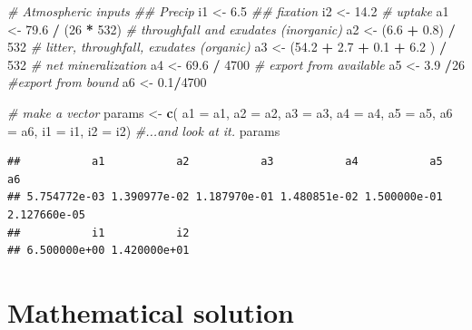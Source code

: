 \documentclass[
]{book}
\newenvironment{Shaded}{\begin{snugshade}}{\end{snugshade}}
\newcommand{\CommentTok}[1]{\textcolor[rgb]{0.56,0.35,0.01}{\textit{#1}}}
\newcommand{\DataTypeTok}[1]{\textcolor[rgb]{0.13,0.29,0.53}{#1}}
\newcommand{\DecValTok}[1]{\textcolor[rgb]{0.00,0.00,0.81}{#1}}
\newcommand{\FloatTok}[1]{\textcolor[rgb]{0.00,0.00,0.81}{#1}}
\newcommand{\KeywordTok}[1]{\textcolor[rgb]{0.13,0.29,0.53}{\textbf{#1}}}
\newcommand{\NormalTok}[1]{#1}
\newcommand{\OperatorTok}[1]{\textcolor[rgb]{0.81,0.36,0.00}{\textbf{#1}}}
\newcommand{\StringTok}[1]{\textcolor[rgb]{0.31,0.60,0.02}{#1}}
\begin{document}
\begin{Shaded}
\begin{Highlighting}[]
\CommentTok{# Atmospheric inputs}
\CommentTok{##  Precip}
\NormalTok{i1 <-}\StringTok{ }\FloatTok{6.5}
\CommentTok{## fixation}
\NormalTok{i2 <-}\StringTok{ }\FloatTok{14.2}
\CommentTok{# uptake}
\NormalTok{a1 <-}\StringTok{ }\FloatTok{79.6} \OperatorTok{/}\StringTok{ }\NormalTok{(}\DecValTok{26} \OperatorTok{*}\StringTok{ }\DecValTok{532}\NormalTok{)}
\CommentTok{# throughfall and exudates (inorganic)}
\NormalTok{a2 <-}\StringTok{ }\NormalTok{(}\FloatTok{6.6} \OperatorTok{+}\StringTok{ }\FloatTok{0.8}\NormalTok{) }\OperatorTok{/}\StringTok{ }\DecValTok{532}
\CommentTok{# litter, throughfall, exudates (organic)}
\NormalTok{a3 <-}\StringTok{ }\NormalTok{(}\FloatTok{54.2} \OperatorTok{+}\StringTok{ }\FloatTok{2.7} \OperatorTok{+}\StringTok{ }\FloatTok{0.1} \OperatorTok{+}\StringTok{ }\FloatTok{6.2}\NormalTok{ ) }\OperatorTok{/}\StringTok{ }\DecValTok{532}
\CommentTok{# net mineralization}
\NormalTok{a4 <-}\StringTok{ }\FloatTok{69.6} \OperatorTok{/}\StringTok{ }\DecValTok{4700}
\CommentTok{# export from available}
\NormalTok{a5 <-}\StringTok{ }\FloatTok{3.9} \OperatorTok{/}\DecValTok{26}
\CommentTok{#export from bound}
\NormalTok{a6 <-}\StringTok{ }\FloatTok{0.1}\OperatorTok{/}\DecValTok{4700}

\CommentTok{# make a vector}
\NormalTok{params <-}\StringTok{ }\KeywordTok{c}\NormalTok{( }\DataTypeTok{a1 =}\NormalTok{ a1, }\DataTypeTok{a2 =}\NormalTok{ a2, }\DataTypeTok{a3 =}\NormalTok{ a3, }\DataTypeTok{a4 =}\NormalTok{ a4, }
            \DataTypeTok{a5 =}\NormalTok{ a5, }\DataTypeTok{a6 =}\NormalTok{ a6, }\DataTypeTok{i1 =}\NormalTok{ i1, }\DataTypeTok{i2 =}\NormalTok{ i2)}
\CommentTok{#...and look at it.}
\NormalTok{params}
\end{Highlighting}
\end{Shaded}

\begin{verbatim}
##           a1           a2           a3           a4           a5           a6 
## 5.754772e-03 1.390977e-02 1.187970e-01 1.480851e-02 1.500000e-01 2.127660e-05 
##           i1           i2 
## 6.500000e+00 1.420000e+01
\end{verbatim}

\hypertarget{mathematical-solution}{%
\section{Mathematical solution}\label{mathematical-solution}}
\end{document}
